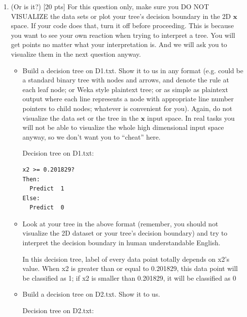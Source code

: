 \documentclass[a4paper]{article}
\theoremstyle{definition}
\def\x{\mathbf x}
\newenvironment{soln}{
    \leavevmode\color{blue}\ignorespaces
}{}
\begin{document}
\begin{enumerate}
\item (Or is it?)  [20 pts] For this question only, make sure you DO NOT VISUALIZE the data sets or plot your tree's decision boundary in the 2D $\x$ space.  If your code does that, turn it off before proceeding.  This is because you want to see your own reaction when trying to interpret a tree.  You will get points no matter what your interpretation is.
And we will ask you to visualize them in the next question anyway.
  \begin{itemize}
  \item Build a decision tree on D1.txt.  Show it to us in any format (e.g. could be a standard binary tree with nodes and arrows, and denote the rule at each leaf node; or Weka style plaintext tree; or as simple as plaintext output where each line represents a node with appropriate line number pointers to child nodes; whatever is convenient for you). Again, do not visualize the data set or the tree in the $\x$ input space.  In real tasks you will not be able to visualize the whole high dimensional input space anyway, so we don't want you to ``cheat'' here.

\begin{soln} 

Decision tree on D1.txt:

\begin{lstlisting}
x2 >= 0.201829?
Then:
  Predict  1
Else:
  Predict  0
\end{lstlisting}
\end{soln}
  \item Look at your tree in the above format (remember, you should not visualize the 2D dataset or your tree's decision boundary) and try to interpret the decision boundary in human understandable English. 

\begin{soln} 
In this decision tree, label of every data point totally depends on x2's value. When x2 is greater than or equal to 0.201829, this data point will be classified as 1; if x2 is smaller than 0.201829, it will be classified as 0
\end{soln}

  \item Build a decision tree on D2.txt.  Show it to us.
\begin{soln} 

Decision tree on D2.txt: 


\end{soln}
\end{itemize}
\end{enumerate}
\end{document}
